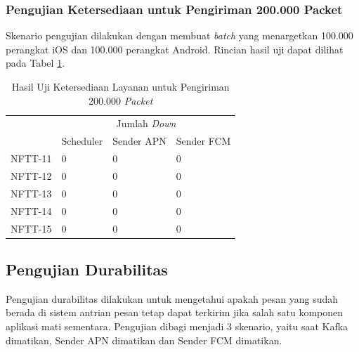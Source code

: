 \subsubsection{Pengujian Ketersediaan untuk Pengiriman 200.000 Packet}
\par Skenario pengujian dilakukan dengan membuat \textit{batch} yang menargetkan 100.000 perangkat iOS dan 100.000 perangkat Android. Rincian hasil uji dapat dilihat pada Tabel \ref{t:ketersediaan-200k}.
\begin{longtable}{|p{1.5cm}|p{2cm}|p{2cm}|p{2cm}|}
	\caption{Hasil Uji Ketersediaan Layanan untuk Pengiriman 200.000 \textit{Packet}} \label{t:ketersediaan-200k} \\ \hline
	\rowcolor{lightgray} & \multicolumn{3}{c|}{Jumlah \textit{Down}} \\ \hhline{~|*3{-}|}
	\rowcolor{lightgray} \multirow{-2}{*}{Kode}  & Scheduler & Sender APN & Sender FCM \\ \hline
	\endhead
	NFTT-11 & 0 & 0 & 0 \\ \hline
	NFTT-12 & 0 & 0 & 0 \\ \hline
	NFTT-13 & 0 & 0 & 0 \\ \hline
	NFTT-14 & 0 & 0 & 0 \\ \hline
	NFTT-15 & 0 & 0 & 0 \\ \hline
\end{longtable}

\subsection{Pengujian Durabilitas}
\par Pengujian durabilitas dilakukan untuk mengetahui apakah pesan yang sudah berada di sistem antrian pesan tetap dapat terkirim jika salah satu komponen aplikasi mati sementara. Pengujian dibagi menjadi 3 skenario, yaitu saat Kafka dimatikan, Sender APN dimatikan dan Sender FCM dimatikan.

